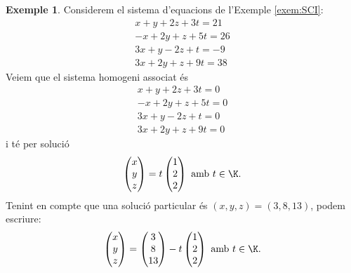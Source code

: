 \documentclass[a4paper,12pt,twoside]{article}
\newcommand{\1}{\mathbf{1}}
\newcommand{\0}{\mathbf{0}}
\theoremstyle{definition}
\newtheorem{exemple}[teorema]{Exemple}
\theoremstyle{remark}
\begin{document}
\begin{exemple}
	Considerem el sistema d'equacions de l'Exemple \ref{exem:SCI}:
	$$
	\begin{array}{c}
	x + y + 2z + 3t = 21 \\
	-x+2y+z+5t=26\\
	3x+y-2z+t=-9\\
	3x+2y+z+9t=38
	\end{array}
	$$
	Veiem que el sistema homogeni associat és
	$$
	\begin{array}{c}
	x + y + 2z + 3t = 0\\
	-x+2y+z+5t=0\\
	3x+y-2z+t=0\\
	3x+2y+z+9t=0
	\end{array}
	$$
	i té per solució
	$$
	\begin{pmatrix}
	x \\ y \\ z
	\end{pmatrix} =
	t \begin{pmatrix}
	1 \\ 2 \\ 2
	\end{pmatrix} \text{ amb $t\in\K$.}
	$$
	Tenint en compte que una solució particular és $(x,y,z)=(3,8,13)$, podem escriure:
	$$
	\begin{pmatrix}
	x \\ y \\ z
	\end{pmatrix} =
	\begin{pmatrix}
	3 \\ 8 \\ 13
	\end{pmatrix}-
	t \begin{pmatrix}
	1 \\ 2 \\ 2
	\end{pmatrix} \text{ amb $t\in\K$.}
	$$
\end{exemple}
\end{document}
